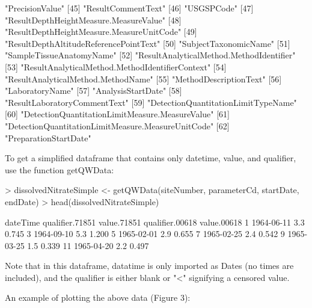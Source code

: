 \documentclass[a4paper,11pt]{article}
\begin{document}
\begin{Schunk}
\begin{Soutput}
[44] "PrecisionValue"                                   
[45] "ResultCommentText"                                
[46] "USGSPCode"                                        
[47] "ResultDepthHeightMeasure.MeasureValue"            
[48] "ResultDepthHeightMeasure.MeasureUnitCode"         
[49] "ResultDepthAltitudeReferencePointText"            
[50] "SubjectTaxonomicName"                             
[51] "SampleTissueAnatomyName"                          
[52] "ResultAnalyticalMethod.MethodIdentifier"          
[53] "ResultAnalyticalMethod.MethodIdentifierContext"   
[54] "ResultAnalyticalMethod.MethodName"                
[55] "MethodDescriptionText"                            
[56] "LaboratoryName"                                   
[57] "AnalysisStartDate"                                
[58] "ResultLaboratoryCommentText"                      
[59] "DetectionQuantitationLimitTypeName"               
[60] "DetectionQuantitationLimitMeasure.MeasureValue"   
[61] "DetectionQuantitationLimitMeasure.MeasureUnitCode"
[62] "PreparationStartDate"                             
\end{Soutput}
\end{Schunk}

To get a simplified dataframe that contains only datetime, value, and qualifier, use the function getQWData:

\begin{Schunk}
\begin{Sinput}
> dissolvedNitrateSimple <- getQWData(siteNumber, parameterCd, 
     startDate, endDate)
> head(dissolvedNitrateSimple)
\end{Sinput}
\begin{Soutput}
     dateTime qualifier.71851 value.71851 qualifier.00618 value.00618
1  1964-06-11                         3.3                       0.745
3  1964-09-10                         5.3                       1.200
5  1965-02-01                         2.9                       0.655
7  1965-02-25                         2.4                       0.542
9  1965-03-25                         1.5                       0.339
11 1965-04-20                         2.2                       0.497
\end{Soutput}
\end{Schunk}
Note that in this dataframe, datatime is only imported as Dates (no times are included), and the qualifier is either blank or "<" signifying a censored value.

An example of plotting the above data (Figure 3):
\end{document}
